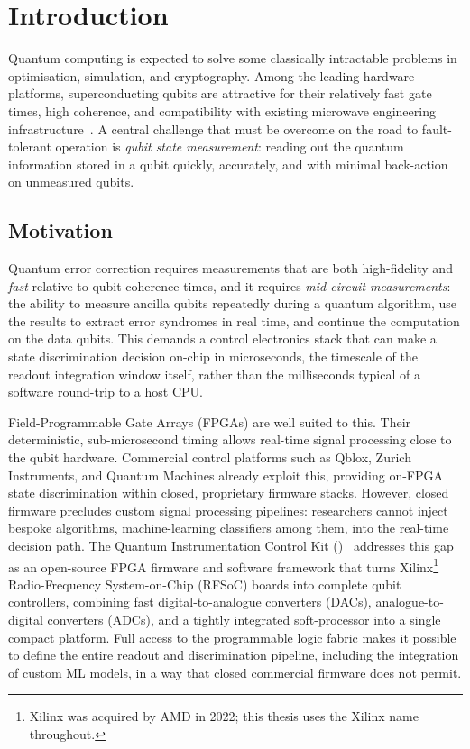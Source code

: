 \section{Introduction}
\label{sec:introduction}

Quantum computing is expected to solve some classically intractable problems
in optimisation, simulation, and cryptography.  Among the leading hardware
platforms, superconducting qubits are attractive for their relatively fast gate
times, high coherence, and compatibility with existing microwave engineering
infrastructure~\cite{Krantz2019}.  A central challenge that must be overcome on
the road to fault-tolerant operation is \emph{qubit state measurement}: reading
out the quantum information stored in a qubit quickly, accurately, and with
minimal back-action on unmeasured qubits.

\subsection{Motivation}

Quantum error correction requires measurements that are both high-fidelity and
\emph{fast} relative to qubit coherence times, and it requires
\emph{mid-circuit measurements}: the ability to measure ancilla qubits repeatedly
during a quantum algorithm, use the results to extract error syndromes in real
time, and continue the computation on the data qubits.  This demands a control electronics stack that can make a state
discrimination decision on-chip in microseconds, the timescale of the readout
integration window itself, rather than the milliseconds typical of a software
round-trip to a host CPU.

Field-Programmable Gate Arrays (FPGAs) are well suited to this.  Their
deterministic, sub-microsecond timing allows real-time signal processing close
to the qubit hardware.  Commercial control platforms such as Qblox, Zurich
Instruments, and Quantum Machines already exploit this, providing on-FPGA state
discrimination within closed, proprietary firmware stacks.  However, closed
firmware precludes custom signal processing pipelines: researchers cannot inject
bespoke algorithms, machine-learning classifiers among them, into the real-time
decision path.  The Quantum Instrumentation Control Kit
(\QICK)~\cite{Stefanazzi2022} addresses this gap as an open-source FPGA firmware
and software framework that turns Xilinx\footnote{Xilinx was acquired by AMD in
2022; this thesis uses the Xilinx name throughout.} Radio-Frequency
System-on-Chip (RFSoC) boards into complete qubit controllers, combining fast digital-to-analogue
converters (DACs), analogue-to-digital converters (ADCs), and a tightly
integrated soft-processor into a single compact platform.  Full access to the
programmable logic fabric makes it possible to define the entire readout and
discrimination pipeline, including the integration of custom ML models, in a way
that closed commercial firmware does not permit.


